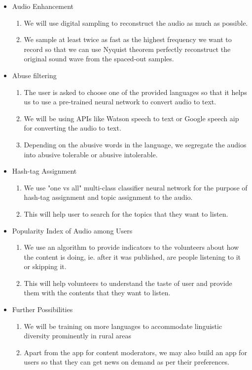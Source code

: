 \documentclass[11pt]{article}
\begin{document}
        \begin{itemize}
			\item Audio Enhancement
			\begin{enumerate}
				\item
					We will use digital sampling to reconstruct the audio as much as possible.
				\item
					We sample at least twice as fast as the highest frequency we want to record so that we can use Nyquist theorem perfectly reconstruct the original sound wave from the spaced-out samples.				
			\end{enumerate}
			\item Abuse filtering
			\begin{enumerate}
				\item
					The user is asked to choose one of the provided languages so that it helps us to use a pre-trained neural network to convert audio to text.
                \item
					We will be using APIs like Watson speech to text or Google speech aip for converting the audio to text.
				\item
					Depending on the abusive words in the language, we segregate the audios into abusive tolerable or abusive intolerable.
			\end{enumerate}
			\item Hash-tag Assignment
			\begin{enumerate}
				\item
					We use "one vs all" multi-class classifier neural network for the purpose of hash-tag assignment and topic assignment to the audio.
                \item
					This will help user to search for the topics that they want to listen.
			\end{enumerate}
			\item Popularity Index of Audio among Users
			\begin{enumerate}
				\item
					We use an algorithm to provide indicators to the volunteers about how the content is doing, ie. after it was published, are people listening to it or skipping it.
                \item
					This will help volunteers to understand the taste of user and provide them with the contents that they want to listen.
			\end{enumerate}
			\item Further Possibilities
			\begin{enumerate}
				\item
				    We will be training on more languages to accommodate linguistic diversity prominently in rural areas
				\item
				    Apart from the app for content moderators, we may also build an app for users so that they can get news on demand as per their preferences.
			\end{enumerate}
		\end{itemize}
\end{document}
